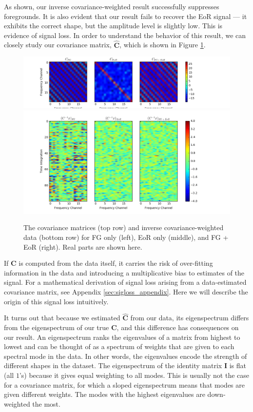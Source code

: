 \documentclass[preprint2,numberedappendix,tighten]{aastex6}  %
\begin{document}
As shown, our inverse covariance-weighted result successfully suppresses foregrounds. It is also evident that our result fails to recover the EoR signal --- it exhibits the correct shape, but the amplitude level is slightly low. This is evidence of signal loss. In order to understand the behavior of this result, we can closely study our covariance matrix, $\hat{\textbf{C}}$, which is shown in Figure \ref{fig:toy_sigloss12}.

\begin{figure}
	\centering
	\includegraphics[trim={1.5cm 0.1cm 3.5cm 0.1cm},clip,width=\columnwidth]{plots/toy_sigloss12.png}
	\includegraphics[trim={1.5cm 0.1cm 3.5cm 0.1cm},clip,width=\columnwidth]{plots/toy_sigloss13.png}
	\caption{The covariance matrices (top row) and inverse covariance-weighted data (bottom row) for FG only (left), EoR only (middle), and FG + EoR (right). Real parts are shown here.}
	\label{fig:toy_sigloss12}
\end{figure}

If $\textbf{C}$ is computed from the data itself, it carries the risk of over-fitting information in the data and introducing a multiplicative bias to estimates of the signal. For a mathematical derivation of signal loss arising from a data-estimated covariance matrix, see Appendix \ref{sec:sigloss_appendix}. Here we will describe the origin of this signal loss intuitively.

It turns out that because we estimated $\hat{\textbf{C}}$ from our data, its eigenspectrum differs from the eigenspectrum of our true $\textbf{C}$, and this difference has consequences on our result. An eigenspectrum ranks the eigenvalues of a matrix from highest to lowest and can be thought of as a spectrum of weights that are given to each spectral mode in the data. In other words, the eigenvalues encode the strength of different shapes in the dataset. The eigenspectrum of the identity matrix $\textbf{I}$ is flat (all $1$'s) because it gives equal weighting to all modes. This is usually not the case for a covariance matrix, for which a sloped eigenspectrum means that modes are given different weights. The modes with the highest eigenvalues are down-weighted the most. 
\end{document}
